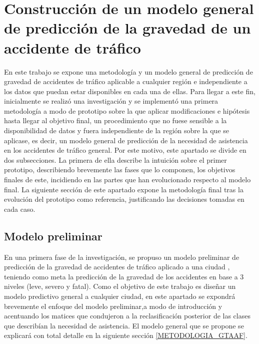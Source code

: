 \documentclass{uathesis-es}
\begin{document}
	
	\chapter{Construcción de un modelo general de predicción de la gravedad de un accidente de tráfico}
	
	En este trabajo se expone una metodología y un modelo general de predicción de gravedad de accidentes de tráfico aplicable a cualquier región e independiente a los datos que puedan estar disponibles en cada una de ellas. Para llegar a este fin, inicialmente se realizó una investigación y se implementó una primera metodología a modo de prototipo sobre la que aplicar modificaciones e hipótesis hasta llegar al objetivo final, un procedimiento que no fuese sensible a la disponibilidad de datos y fuera independiente de la región sobre la que se aplicase, es decir, un modelo general de predicción de la necesidad de asistencia en los accidentes de tráfico general. Por este motivo, este apartado se divide en dos subsecciones. La primera de ella describe la intuición sobre el primer prototipo, describiendo brevemente las fases que lo componen, los objetivos finales de este, incidiendo en las partes que han evolucionado respecto al modelo final. La siguiente sección de este apartado expone la metodología final tras la evolución del prototipo como referencia, justificando las decisiones tomadas en cada caso.
	
	
	\section{Modelo preliminar}
	\label{METODOLOGIA_MODELO_PRELIMINAR}
	
	
	
	En una primera fase de la investigación, se propuso un modelo preliminar de predicción de la gravedad de accidentes de tráfico aplicado a una ciudad \cite{PEREZSALA2023113245}, teniendo como meta la predicción de la gravedad de los accidentes en base a 3 niveles (leve, severo y fatal). Como el objetivo de este trabajo es diseñar un modelo predictivo general a cualquier ciudad, en este apartado se expondrá brevemente el enfoque del modelo preliminar,a modo de introducción y acentuando los matices que condujeron a la reclasificación posterior de las clases que describían la necesidad de asistencia. El modelo general que se propone se explicará con total detalle en la siguiente sección \ref{METODOLOGIA_GTAAF}.
	
\end{document}
